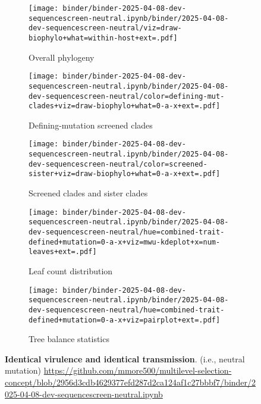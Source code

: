\begin{figure*}[htbp]
  \centering
  \begin{subfigure}{0.32\textwidth}
    \centering
    \texttt{[image: binder/binder-2025-04-08-dev-sequencescreen-neutral.ipynb/binder/2025-04-08-dev-sequencescreen-neutral/viz=draw-biophylo+what=within-host+ext=.pdf]}
    \caption{Overall phylogeny}
    \label{fig:dev-sequencescreen-neutral:overall_phylogeny}
  \end{subfigure}
  \hfill
  \begin{subfigure}{0.32\textwidth}
    \centering
    \texttt{[image: binder/binder-2025-04-08-dev-sequencescreen-neutral.ipynb/binder/2025-04-08-dev-sequencescreen-neutral/color=defining-mut-clades+viz=draw-biophylo+what=0-a-x+ext=.pdf]}
    \caption{Defining-mutation screened clades}
    \label{fig:dev-sequencescreen-neutral:defining_mut_clades}
  \end{subfigure}
  \hfill
  \begin{subfigure}{0.32\textwidth}
    \centering
    \texttt{[image: binder/binder-2025-04-08-dev-sequencescreen-neutral.ipynb/binder/2025-04-08-dev-sequencescreen-neutral/color=screened-sister+viz=draw-biophylo+what=0-a-x+ext=.pdf]}
    \caption{Screened clades and sister clades}
    \label{fig:dev-sequencescreen-neutral:screened_sister}
  \end{subfigure}

  \vspace{0.5cm} %

  \begin{subfigure}{0.54\textwidth}
    \centering
    \texttt{[image: binder/binder-2025-04-08-dev-sequencescreen-neutral.ipynb/binder/2025-04-08-dev-sequencescreen-neutral/hue=combined-trait-defined+mutation=0-a-x+viz=mwu-kdeplot+x=num-leaves+ext=.pdf]}
    \caption{Leaf count distribution}
    \label{fig:dev-sequencescreen-neutral:leaf_count}
  \end{subfigure}
  \hfill
  \begin{subfigure}{0.44\textwidth}
    \centering
    \texttt{[image: binder/binder-2025-04-08-dev-sequencescreen-neutral.ipynb/binder/2025-04-08-dev-sequencescreen-neutral/hue=combined-trait-defined+mutation=0-a-x+viz=pairplot+ext=.pdf]}
    \caption{Tree balance statistics}
    \label{fig:dev-sequencescreen-neutral:tree_balance}
  \end{subfigure}

  \caption{\textbf{Identical virulence and identical transmission}. (i.e., neutral mutation) \url{https://github.com/mmore500/multilevel-selection-concept/blob/2956d3cdb4629377efd287d2ca124af1c27bbbf7/binder/2025-04-08-dev-sequencescreen-neutral.ipynb}}
  \label{fig:dev-sequencescreen-neutral}
\end{figure*}
